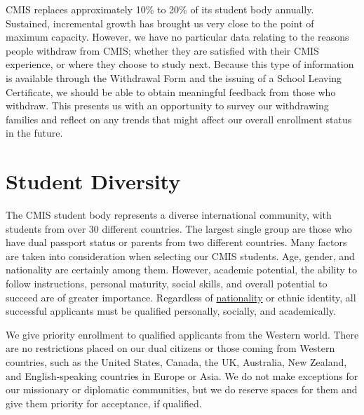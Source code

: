 

CMIS replaces approximately 10\% to 20\% of its student body annually.  Sustained, incremental growth has brought us very close to the point of maximum capacity.  However, we have no particular data relating to the reasons people withdraw from CMIS; whether they are satisfied with their CMIS experience, or where they choose to study next.  Because this type of information is available through the Withdrawal Form and the issuing of a School Leaving Certificate, we should be able to obtain meaningful feedback from those who withdraw.  This presents us with an opportunity to survey our withdrawing families and reflect on any trends that might affect our overall enrollment status in the future. 
\section{Student Diversity}


The CMIS student body represents a diverse international community, with students from over 30 different countries.  The largest single group are those who have dual passport status or parents from two different countries.  Many factors are taken into consideration when selecting our CMIS students.  Age, gender, and nationality are certainly among them.  However, academic potential, the ability to follow instructions, personal maturity, social skills, and overall potential to succeed are of greater importance.  Regardless of \href{https://docs.google.com/spreadsheets/d/15wjkZ9Yy__KpVuhKlawJuoMAAlCE6FMBsOJMKjXacYA/edit?ts=579eee90#gid=0}{nationality} or ethnic identity, all successful applicants must be qualified personally, socially, and academically.  

We give priority enrollment to qualified applicants from the Western world.  There are no restrictions placed on our dual citizens or those coming from Western countries, such as the United States, Canada, the UK, Australia, New Zealand, and English-speaking countries in Europe or Asia.  We do not make exceptions for our missionary or diplomatic communities, but we do reserve spaces for them and give them priority for acceptance, if qualified.  

